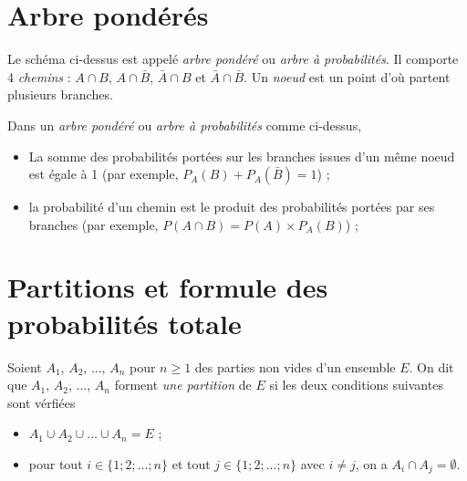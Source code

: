 \documentclass[french]{book}
\begin{document}
\section{Arbre pondérés}


\begin{defn}
Le schéma ci-dessus est appelé \emph{arbre pondéré} ou \emph{arbre à probabilités}. Il comporte 4 \emph{chemins} : $A\cap B$, $A\cap \bar{B}$, $\bar{A}\cap B$ et $\bar{A}\cap \bar{B}$. Un \emph{noeud} est un point d'où partent plusieurs branches.
\end{defn}



\begin{prop}
Dans un \emph{arbre pondéré} ou \emph{arbre à probabilités} comme ci-dessus,
\begin{itemize}
\item[$\bullet$] La somme des probabilités portées sur les branches issues d'un même noeud est égale à 1 (par exemple, $P_A(B)+P_A(\bar{B})=1$) ;
\item[$\bullet$] la probabilité d'un chemin est le produit des probabilités portées par ses branches (par exemple, $P(A\cap B)=P(A) \times P_A(B)$) ;
\end{itemize}
\end{prop}


\section{Partitions et formule des probabilités totale}

\begin{defn}
 Soient $A_1$, $A_2$, ..., $A_n$ pour $n\geq 1$ des parties non vides d'un ensemble $E$. On dit que $A_1$, $A_2$, ..., $A_n$ forment \emph{une partition} de $E$ si les deux conditions suivantes sont vérfiées 
\begin{itemize}
 \item[$\bullet$] $A_1\cup A_2\cup ... \cup A_n=E$ ;
\item[$\bullet$] pour tout $i\in \{1;2;...;n\}$ et tout $j\in\{1;2;...;n\}$ avec $i\neq j$, on a $A_i\cap A_j=\emptyset$.
\end{itemize}
\end{defn}

\end{document}

